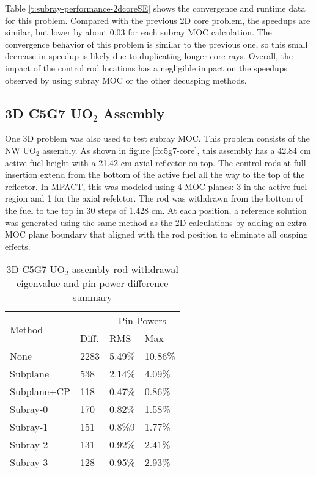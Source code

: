 Table \ref{t:subray-performance-2dcoreSE} shows the convergence and runtime data for this problem.  Compared with the previous 2D core problem, the speedups are similar, but lower by about 0.03 for each subray MOC calculation.  The convergence behavior of this problem is similar to the previous one, so this small decrease in speedup is likely due to duplicating longer core rays.  Overall, the impact of the control rod locations has a negligible impact on the speedups observed by using subray MOC or the other decusping methods.

\subsection{3D C5G7 UO\texorpdfstring{$_2$}{2} Assembly}

One 3D problem was also used to test subray MOC.  This problem consists of the NW UO$_2$ assembly.  As shown in figure \ref{f:c5g7-core}, this assembly has a 42.84 cm active fuel height with a 21.42 cm axial reflector on top.  The control rods at full insertion extend from the bottom of the active fuel all the way to the top of the reflector.  In MPACT, this was modeled using 4 MOC planes: 3 in the active fuel region and 1 for the axial refelctor.  The rod was withdrawn from the bottom of the fuel to the top in 30 steps of 1.428 cm.  At each position, a reference solution was generated using the same method as the 2D calculations by adding an extra MOC plane boundary that aligned with the rod position to eliminate all cusping effects.

\begin{table}
    \centering
    \caption{3D C5G7 UO$_2$ assembly rod withdrawal eigenvalue and pin power difference summary}\label{t:c5g7-3d-assembly}
    \begin{tabular}{l l l l}\toprule
        \multirow{2}{*}{Method} & \keff{} & \multicolumn{2}{c}{Pin Powers} \\
         & Diff. & RMS & Max \\\midrule
         None & 2283 & 5.49\% & 10.86\% \\
         Subplane & 538 & 2.14\% & 4.09\% \\
         Subplane+CP & 118 & 0.47\% & 0.86\% \\
         Subray-0 & 170 & 0.82\% & 1.58\% \\
         Subray-1 & 151 & 0.8\%9 & 1.77\% \\
         Subray-2 & 131 & 0.92\% & 2.41\% \\
         Subray-3 & 128 & 0.95\% & 2.93\% \\
         \bottomrule
    \end{tabular}
\end{table}

